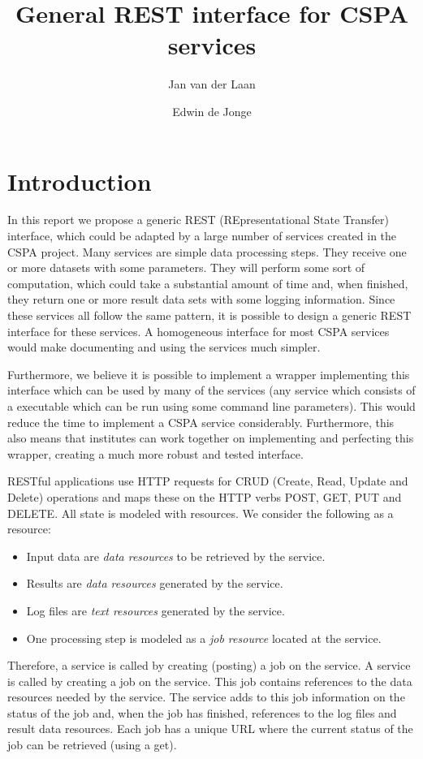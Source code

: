 \documentclass[a4paper]{article}
\title{General REST interface for CSPA services}
\author{Jan van der Laan \and Edwin de Jonge}
\begin{document}
\maketitle

\section{Introduction}

In this report we propose a generic REST (REpresentational State Transfer)
interface, which could be adapted by a large number of services created in the
CSPA project. Many services are simple data processing steps. They receive one
or more datasets with some parameters.  They will perform some sort of
computation, which could take a substantial amount of time and, when finished,
they return one or more result data sets with some logging information.  Since
these services all follow the same pattern, it is possible to design a generic
REST interface for these services. A homogeneous interface for most CSPA
services would make documenting and using the services much simpler. 

Furthermore, we believe it is possible to implement a wrapper implementing this
interface which can be used by many of the services (any service which consists
of a executable which can be run using some command line parameters). This would
reduce the time to implement a CSPA service considerably.  Furthermore, this
also means that institutes can work together on implementing and perfecting this
wrapper, creating a much more robust and tested interface. 

RESTful applications use HTTP requests for CRUD (Create, Read, Update and
Delete) operations and maps these on the HTTP verbs POST, GET, PUT and DELETE.
All state is modeled with resources. We consider the following as a resource:

\begin{itemize}
  \item Input data are \emph{data resources} to be retrieved by the service.
  \item Results are \emph{data resources} generated by the service.
  \item Log files are \emph{text resources} generated by the service.
  \item One processing step is modeled as a \emph{job resource} located at the
  service.
\end{itemize}

Therefore, a service is called by creating (posting) a job on the service.  A
service is called by creating a job on the service. This job contains references
to the data resources needed by the service. The service adds to this job
information on the status of the job and, when the job has finished, references
to the log files and result data resources. Each job has a unique URL where the
current status of the job can be retrieved (using a get). 
\end{document}

